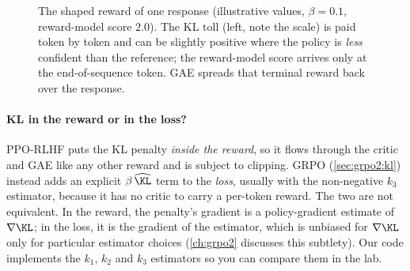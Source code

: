 \begin{figure}[ht]
\centering
{}
\caption{The shaped reward of one response (illustrative values, $\beta=0.1$, reward-model
score $2.0$). The KL toll (left, note the scale) is paid token by token and can be slightly positive where the policy is \emph{less} confident than
the reference; the reward-model score arrives only at the end-of-sequence token. GAE spreads that
terminal reward back over the response.}
\label{fig:rlhf:shaped}
\end{figure}

\paragraph{KL in the reward or in the loss?} PPO-RLHF puts the KL penalty \emph{inside the reward},
so it flows through the critic and GAE like any other reward and is subject to clipping. GRPO
(\cref{sec:grpo2:kl}) instead adds an explicit $\beta\,\widehat{\KL}$ term to the
\emph{loss}, usually with the non-negative $k_3$ estimator, because it has no critic to carry a per-token reward.
The two are not equivalent. In the reward, the penalty's gradient is a policy-gradient estimate of
$\nabla\KL$; in the loss, it is the gradient of the estimator, which is unbiased for $\nabla\KL$
only for particular estimator choices (\cref{ch:grpo2} discusses this subtlety). Our code
implements the $k_1$, $k_2$ and $k_3$ estimators so you can compare them in the lab.

